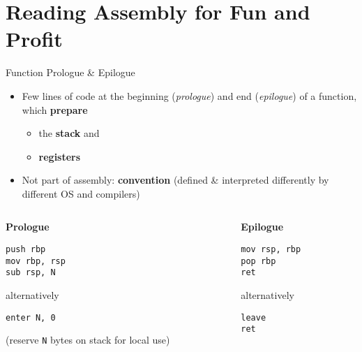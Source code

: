 \begin{frame}
    \centering
    \scalebox{3}{Reading x86-64 Assembly}

    \scalebox{2}{\ldots for fun and profit}
\end{frame}

\section{Reading Assembly for Fun and Profit}

\begin{frame}[fragile]{Function Prologue \& Epilogue}
    \begin{itemize}
        \item Few lines of code at the beginning (\textit{prologue}) and end (\textit{epilogue}) of a function, which \textbf{prepare}
        \begin{itemize}
            \item the \textbf{stack} and 
            \item \textbf{registers}
        \end{itemize}
        \item Not part of assembly: \textbf{convention} (defined \& interpreted differently by different OS and compilers)
    \end{itemize}

    \begin{columns}[t]
        \begin{column}{.45\textwidth}
            \textbf{Prologue}
            \begin{lstlisting}[language={}]
push rbp
mov rbp, rsp
sub rsp, N
            \end{lstlisting}
            alternatively
            \begin{lstlisting}[language={}]
enter N, 0
            \end{lstlisting}
            (reserve \texttt{N} bytes on stack for local use)
        \end{column}
        \begin{column}{.45\textwidth}
            \textbf{Epilogue}
            \begin{lstlisting}[language={}]
mov rsp, rbp
pop rbp
ret
            \end{lstlisting}
            alternatively
            \begin{lstlisting}[language={}]
leave
ret
            \end{lstlisting}
        \end{column}
    \end{columns}
\end{frame}

